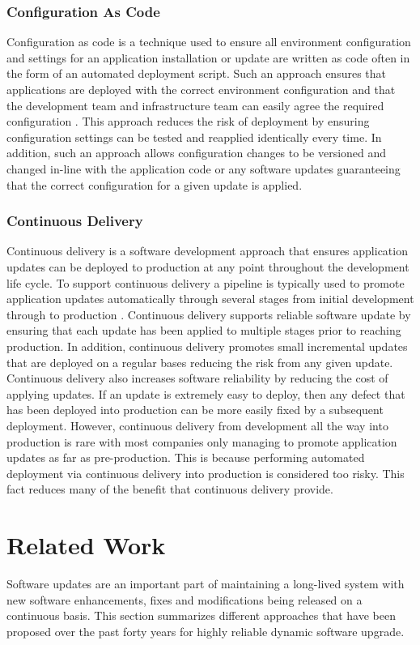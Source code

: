 \documentclass[a4paper,11pt,twoside]{article}
\begin{document}
\subsubsection{Configuration As Code}
Configuration as code is a technique used to ensure all environment configuration and settings for an application installation or update are written as code often in the form of an automated deployment script. Such an approach ensures that applications are deployed with the correct environment configuration and that the development team and infrastructure team can easily agree the required configuration \cite{Continuous Delivery}. This approach reduces the risk of deployment by ensuring configuration settings can be tested and reapplied identically every time. In addition, such an approach allows configuration changes to be versioned and changed in-line with the application code or any software updates guaranteeing that the correct configuration for a given update is applied.

\subsubsection{Continuous Delivery}
Continuous delivery is a software development approach that ensures application updates can be deployed to production at any point throughout the development life cycle. To support continuous delivery a pipeline is typically used to promote application updates automatically through several stages from initial development through to production \cite{Continuous Delivery}. Continuous delivery supports reliable software update by ensuring that each update has been applied to multiple stages prior to reaching production. In addition, continuous delivery promotes small incremental updates that are deployed on a regular bases reducing the risk from any given update. Continuous delivery also increases software reliability by reducing the cost of applying updates. If an update is extremely easy to deploy, then any defect that has been deployed into production can be more easily fixed by a subsequent deployment. However, continuous delivery from development all the way into production is rare with most companies only managing to promote application updates as far as pre-production. This is because performing automated deployment via continuous delivery into production is considered too risky. This fact reduces many of the benefit that continuous delivery provide.


\clearpage
\section{Related Work}
Software updates are an important part of maintaining a long-lived system with new software enhancements, fixes and modifications being released on a continuous basis. This section summarizes different approaches that have been proposed over the past forty years for highly reliable dynamic software upgrade.
\end{document}
